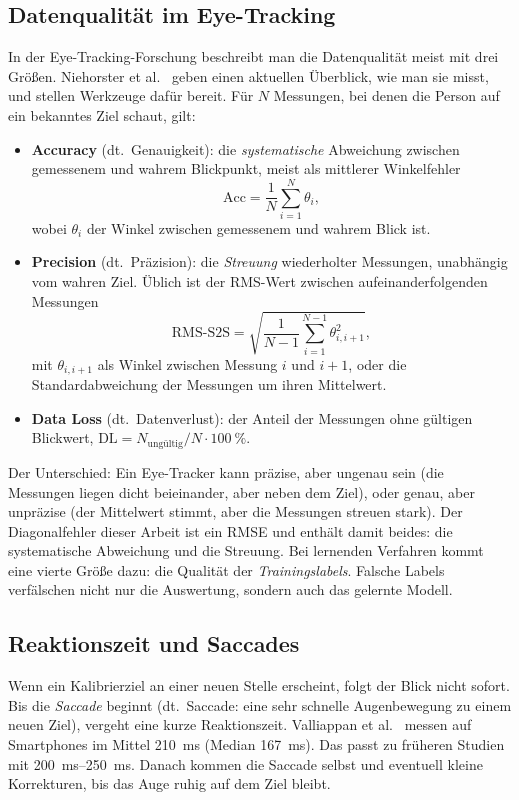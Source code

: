 \subsection{Datenqualität im Eye-Tracking}
\label{subsec:datenqualitaet}
In der Eye-Tracking-Forschung beschreibt man die Datenqualität meist mit drei
Größen. Niehorster et al.~\cite{niehorster2026quality} geben einen aktuellen
Überblick, wie man sie misst, und stellen Werkzeuge dafür bereit. Für $N$
Messungen, bei denen die Person auf ein bekanntes Ziel schaut, gilt:
\begin{itemize}
  \item \textbf{Accuracy} (dt.\ Genauigkeit): die \emph{systematische}
        Abweichung zwischen gemessenem und wahrem Blickpunkt, meist als
        mittlerer Winkelfehler
        \[
          \mathrm{Acc} = \frac{1}{N}\sum_{i=1}^{N} \theta_i ,
        \]
        wobei $\theta_i$ der Winkel zwischen gemessenem und wahrem Blick ist.
  \item \textbf{Precision} (dt.\ Präzision): die \emph{Streuung} wiederholter
        Messungen, unabhängig vom wahren Ziel. Üblich ist der
        RMS-Wert zwischen aufeinanderfolgenden Messungen
        \[
          \mathrm{RMS\text{-}S2S} = \sqrt{\frac{1}{N-1}\sum_{i=1}^{N-1} \theta_{i,i+1}^{2}} ,
        \]
        mit $\theta_{i,i+1}$ als Winkel zwischen Messung $i$ und $i+1$, oder
        die Standardabweichung der Messungen um ihren Mittelwert.
  \item \textbf{Data Loss} (dt.\ Datenverlust): der Anteil der Messungen
        ohne gültigen Blickwert,
        $\mathrm{DL} = N_{\text{ungültig}} / N \cdot \SI{100}{\percent}$.
\end{itemize}
Der Unterschied: Ein Eye-Tracker kann präzise, aber ungenau sein (die
Messungen liegen dicht beieinander, aber neben dem Ziel), oder genau, aber
unpräzise (der Mittelwert stimmt, aber die Messungen streuen stark). Der
Diagonalfehler dieser Arbeit ist ein RMSE und enthält damit beides: die
systematische Abweichung und die Streuung. Bei
lernenden Verfahren kommt eine vierte Größe dazu: die Qualität der
\emph{Trainingslabels}. Falsche Labels verfälschen nicht nur die Auswertung,
sondern auch das gelernte Modell.

\subsection{Reaktionszeit und Saccades}
\label{subsec:latenz}
Wenn ein Kalibrierziel an einer neuen Stelle erscheint, folgt der Blick nicht
sofort. Bis die \emph{Saccade} beginnt (dt.\ Saccade: eine sehr schnelle
Augenbewegung zu einem neuen Ziel), vergeht eine kurze Reaktionszeit. Valliappan et al.~\cite{valliappan2020smartphone} messen auf
Smartphones im Mittel \SI{210}{\milli\second} (Median \SI{167}{\milli\second}).
Das passt zu früheren Studien mit \SIrange{200}{250}{\milli\second}. Danach
kommen die Saccade selbst und eventuell kleine Korrekturen, bis das Auge ruhig
auf dem Ziel bleibt.

